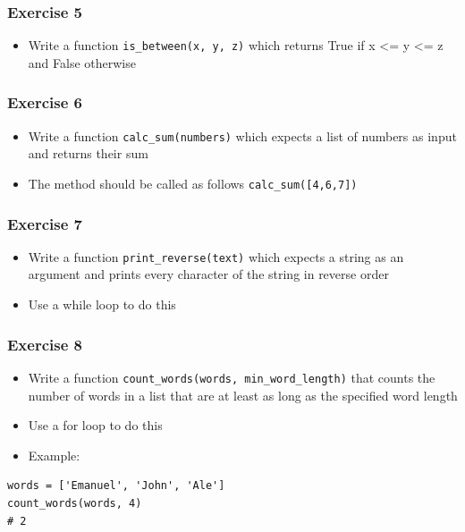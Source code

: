 \documentclass[10pt, a4paper]{beamer} %
\begin{document}
{\begin{frame}[c, fragile]
\end{frame}

\begin{frame}[t, fragile]\frametitle{Exercise 5}
\begin{itemize}
    \item Write a function \texttt{is\_between(x, y, z)} which returns True if x <= y <=
z and False otherwise
\end{itemize}
    
\end{frame}

\begin{frame}[c, fragile]\frametitle{Exercise 6}
    
\begin{itemize}
    \item Write a function \texttt{calc\_sum(numbers)} which expects a list of numbers as input and returns their sum
    \item The method should be called as follows \texttt{calc\_sum([4,6,7])}
\end{itemize}
\end{frame}

\begin{frame}[c, fragile]\frametitle{Exercise 7}
    
\begin{itemize}
    \item Write a function \texttt{print\_reverse(text)} which expects a string as an argument and prints every character of the string in reverse order
    \item Use a while loop to do this
\end{itemize}
\end{frame}

\begin{frame}[c, fragile]\frametitle{Exercise 8}
\begin{itemize}
\item Write a function \texttt{count\_words(words, min\_word\_length)} that counts the number of words in a list that are at least as long as the specified word length
\item Use a for loop to do this
\item Example:
\end{itemize}

{
\mdseries
{}
\begin{lstlisting}
words = ['Emanuel', 'John', 'Ale']
count_words(words, 4)
# 2
\end{lstlisting}
}


\end{frame}}
\end{document}
